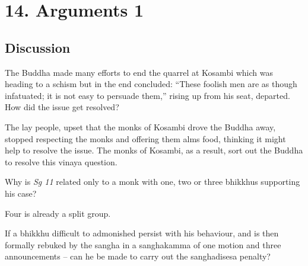 \chapter{14. Arguments 1}
\renewcommand*{\theChapterTitle}{14. Arguments 1}

\section*{Discussion}


The Buddha made many efforts to end the quarrel at Kosambi which was heading to
a schism but in the end concluded: “These foolish men are as though infatuated;
it is not easy to persuade them,” rising up from his seat, departed. How did the
issue get resolved?

\begin{solution}
  The lay people, upset that the monks of Kosambi drove the Buddha away,
  stopped respecting the monks and offering them alms food, thinking it might
  help to resolve the issue. The monks of Kosambi, as a result, sort out the
  Buddha to resolve this vinaya question.
\end{solution}

\bigskip


Why is \emph{Sg 11} related only to a monk with one, two or three bhikkhus supporting his case?

\bigskip

\begin{solution}
  Four is already a split group.
\end{solution}


If a bhikkhu difficult to admonished persist with his behaviour, and is then
formally rebuked by the sangha in a sanghakamma of one motion and three
announcements – can he be made to carry out the sanghadisesa penalty?

